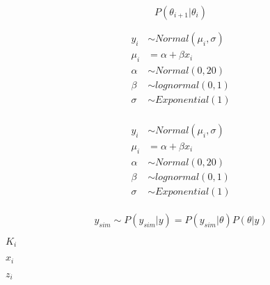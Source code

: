 \documentclass[10pt]{book}
\begin{document}
\begin{mdSnippets}
\begin{mdDisplaySnippet}[037eb4d5440cd9d8d9c8b27dca944e7a]%
\[%
P(\theta_{i+1} | \theta_i)
\]%
\end{mdDisplaySnippet}%
\begin{mdDisplaySnippet}[baeb59b81e1d5c4797ef21f0f3738eb7]%
\[%
\begin{aligned} 
  y_i &\sim Normal(\mu_i, \sigma) \\
  \mu_i &= \alpha + \beta x_i  \\
  \alpha &\sim Normal(0, 20) \\
  \beta &\sim lognormal(0, 1) \\
  \sigma &\sim Exponential(1) \\
\end{aligned} 
\]%
\end{mdDisplaySnippet}%
\begin{mdDisplaySnippet}[baeb59b81e1d5c4797ef21f0f3738eb7]%
\[%
\begin{aligned} 
  y_i &\sim Normal(\mu_i, \sigma) \\
  \mu_i &= \alpha + \beta x_i  \\
  \alpha &\sim Normal(0, 20) \\
  \beta &\sim lognormal(0, 1) \\
  \sigma &\sim Exponential(1) \\
\end{aligned} 
\]%
\end{mdDisplaySnippet}%
\begin{mdDisplaySnippet}[7d992ed7cb88d50e995a70635d84bcd2]%
\[%
y_{sim} \sim P(y_{sim}|y) = P(y_{sim}|\theta) P(\theta|y)
\]%
\end{mdDisplaySnippet}%
\begin{mdInlineSnippet}[201400d073866463c42632818d600ec1]%
{$K_i$}\end{mdInlineSnippet}%
\begin{mdInlineSnippet}%
{$x_i$}\end{mdInlineSnippet}%
\begin{mdInlineSnippet}[5a5ae0760dc3dac91e546c0ea25586b0]%
{$z_i$}\end{mdInlineSnippet}%

\end{mdSnippets}
\end{document}
